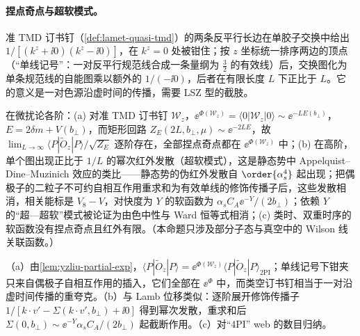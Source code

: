 
\paragraph{捏点奇点与超软模式。}准 TMD 订书钉（\cref{def:lamet-quasi-tmd}）的两条反平行长边在单胶子交换中给出 $1/[(k^z+\ii0)(k^z-\ii0)]$，在 $k^z=0$ 处被钳住；按 $z$ 坐标统一排序两边的顶点（“单线记号”：一对反平行规范线合成一条量纲为 $\frac32$ 的有效线）后，交换图化为单条规范线的自能图乘以额外的 $1/(-\ii0)$，后者在有限长度 $L$ 下正比于 $L$\cite[式~(41)--(43)]{Liu:2022nnk}。它的意义是一对色源沿虚时间的传播，需要 LSZ 型的截肢。

\begin{proposition}\label{prop:yzliu-pinch-ultrasoft}
在微扰论各阶：(a) 对准 TMD 订书钉 $\mathcal W_z$，$\ee^{\Phi(\mathcal W_z)}=\langle0|\mathcal W_z|0\rangle\sim\ee^{-LE(b_\perp)}$，$E=2\delta m+V(b_\perp)$，而矩形回路 $Z_E(2L,b_\perp,\mu)\sim\ee^{-2LE}$，故 $\lim_{L\to\infty}\langle P|\tilde O_z|P\rangle/\sqrt{Z_E}$ 逐阶存在，全部捏点奇点都在 $\ee^{\Phi(\mathcal W_z)}$ 中；(b) 在高阶，单个图出现正比于 $1/L$ 的幂次红外发散（超软模式），这是静态势中 Appelquist--Dine--Muzinich 效应的类比——静态势的伪红外发散自 $\order{\alpha_s^4}$ 起出现\cite{Appelquist:1977es,Brambilla:1999qa}；把偶极子的二粒子不可约自相互作用重求和为有效单线的修饰传播子后，这些发散相消，相关能标是 $V_8-V$，对快度为 $Y$ 的软函数为 $\alpha_sC_A\ee^{-Y}/(2b_\perp)$；依赖 $Y$ 的“超—超软”模式被论证为由色中性与 Ward 恒等式相消；(c) 类时、双重时序的软函数没有捏点奇点且红外有限。（本命题只涉及部分子态与真空中的 Wilson 线关联函数。）
\end{proposition}

\begin{proofsketch}
（a）由\cref{lem:yzliu-partial-exp}，$\langle P|\tilde O_z|P\rangle=\ee^{\Phi(\mathcal W_z)}\langle P|\tilde O_z|P\rangle_{\mathrm{2PI}}$；单线记号下钳夹只来自偶极子自相互作用的插入，它们全部在 $\ee^{\Phi}$ 中，而类空订书钉相当于一对沿虚时间传播的重夸克\cite[第~3.2~节]{Liu:2022nnk}。（b）与 Lamb 位移类似：逐阶展开修饰传播子 $1/[k\cdot v'-\Sigma(k\cdot v',b_\perp)+\ii0]$ 得到幂次发散，重求和后 $\Sigma(0,b_\perp)\sim\ee^{-Y}\alpha_sC_A/(2b_\perp)$ 起截断作用\cite[第~3.3、4.3~节，式~(109)--(111)]{Liu:2022nnk}。（c）对“4PI” web 的数目归纳\cite[附录~D]{Liu:2022nnk}。
\end{proofsketch}


